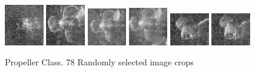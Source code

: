 \begin{figure}
    \includegraphics[width=0.15\textwidth]{chapters/images/dataset/all-class-images/propeler/propeler-15.jpg}
    \includegraphics[width=0.15\textwidth]{chapters/images/dataset/all-class-images/propeler/propeler-61.jpg}
    \includegraphics[width=0.15\textwidth]{chapters/images/dataset/all-class-images/propeler/propeler-98.jpg}
    \includegraphics[width=0.15\textwidth]{chapters/images/dataset/all-class-images/propeler/propeler-27.jpg}
    \includegraphics[width=0.15\textwidth]{chapters/images/dataset/all-class-images/propeler/propeler-130.jpg}
    \includegraphics[width=0.15\textwidth]{chapters/images/dataset/all-class-images/propeler/propeler-126.jpg}
    
    \caption{Propeller Class. 78 Randomly selected image crops}
    \label{appendix:propeller}
\end{figure}

